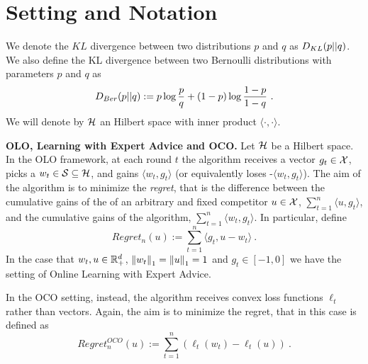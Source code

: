 \section{Setting and Notation}

We denote the $KL$ divergence between two distributions $p$ and $q$ as $D_{KL}(p||q)$.
We also define the KL divergence between two Bernoulli distributions with parameters $p$ and $q$ as
\[
D_{Ber}(p||q) := p \log\frac{p}{q} + (1-p) \log\frac{1-p}{1-q}~.
\]
We will denote by $\mathcal{H}$ an Hilbert space with inner product $\langle \cdot, \cdot\rangle$.

\vspace{0.2cm}\noindent\textbf{\ac{OLO}, Learning with Expert Advice and \ac{OCO}.}
Let $\mathcal{H}$ be a Hilbert space. In the \ac{OLO} framework, at each round $t$ the algorithm receives a vector $g_t \in \mathcal{X}$, picks a $w_t \in \mathcal{S} \subseteq \mathcal{H}$, and gains $\langle w_t,g_t \rangle$ (or equivalently loses -$\langle w_t,g_t \rangle$).
The aim of the algorithm is to minimize the \emph{regret}, that is the difference between the cumulative gains of the 
of an arbitrary and fixed competitor $u \in \mathcal{X}$, $\sum_{t=1}^n \langle u,g_t \rangle$, and 
the cumulative gains of the algorithm, $\sum_{t=1}^n \langle w_t,g_t \rangle$.
In particular, define
\[
Regret_n(u) := \sum_{t=1}^n \langle g_t , u - w_t \rangle~.
\]
In the case that $w_t, u \in \mathbb{R}^d_+$, $\left\|{w_t}\right\|_1=\left\|{u}\right\|_1=1$ and $g_t \in [-1,0]$ we have the setting of Online Learning with Expert Advice.

In the \ac{OCO} setting, instead, the algorithm receives convex loss functions $\ell_t$ rather than vectors.
Again, the aim is to minimize the regret, that in this case is defined as
\[
Regret^{OCO}_n(u) := \sum_{t=1}^n \left(\ell_t(w_t) -\ell_t(u)\right)~.
\]

